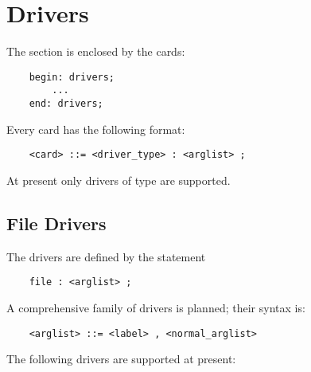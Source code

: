 %
%
%
%
%
% 
%
%

\chapter{Drivers}\label{sec:DRIVERS}
The  section is enclosed by the cards:
\begin{verbatim}
    begin: drivers;
        ...
    end: drivers;
\end{verbatim}
Every  card has the following format:
\begin{verbatim}
    <card> ::= <driver_type> : <arglist> ;
\end{verbatim}
At present only  drivers of type  are supported.

\section{File Drivers}
The  drivers are defined by the statement
\begin{verbatim}
    file : <arglist> ;
\end{verbatim}
A comprehensive family of  drivers is planned;
their syntax is:
\begin{verbatim}
    <arglist> ::= <label> , <normal_arglist>
\end{verbatim}
The following  drivers are supported at present:




